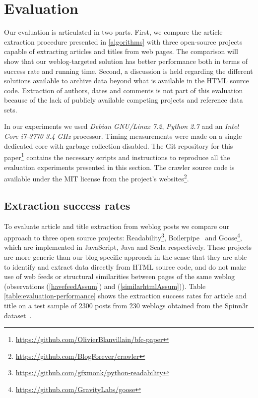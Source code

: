 \section{Evaluation}
\label{evaluation}

Our evaluation is articulated in two parts. First, we compare the 
article extraction procedure presented in \autoref{algorithms} with 
three open-source projects capable of extracting articles and titles 
from web pages. The comparison will show that our weblog-targeted solution 
has better performance both in terms of success rate and running time. 
Second, a discussion is held regarding the different solutions available 
to archive data beyond what is available in the HTML source code. 
Extraction of authors, dates and comments is not part of this evaluation 
because of the lack of publicly available competing projects and 
reference data sets.

In our experiments we used \emph{Debian GNU/Linux 7.2}, \emph{Python 2.7} 
and an \emph{Intel Core i7-3770 3.4 GHz} processor. Timing measurements 
were made on a single dedicated core with garbage collection disabled. 
The Git repository for this 
paper\footnote{\url{https://github.com/OlivierBlanvillain/bfc-paper}} 
contains the necessary scripts and instructions to reproduce all the 
evaluation experiments presented in this section. The crawler source 
code is available under the MIT license from the project's 
websites\footnote{\url{https://github.com/BlogForever/crawler}}.

\subsection{Extraction success rates}

To evaluate article and title extraction from weblog posts 
we compare our approach to three open source projects: 
Readability\footnote{\url{https://github.com/gfxmonk/python-readability}}, 
Boilerpipe~\cite{kohlschuetter2010} and Goose\footnote{\url{https://github.com/GravityLabs/goose}}, 
which are implemented in JavaScript, Java and Scala respectively. 
These projects are more generic than our blog-specific approach in the 
sense that they are able to identify and extract data directly from HTML 
source code, and do not make use of web feeds or structural similarities 
between pages of the same weblog (observations (\ref{havefeedAssum}) and 
(\ref{similarhtmlAssum})). Table \ref{table:evaluation-performance} shows the extraction 
success rates for article and title on a test sample of 2300 posts 
from 230 weblogs obtained from the Spinn3r dataset~\cite{burton2011}.

